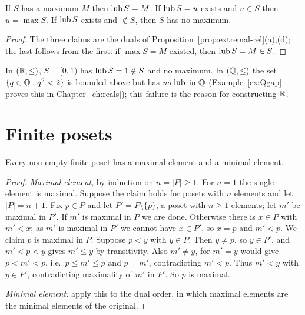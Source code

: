 \begin{proposition}\label{prop:lub-max}
	If $S$ has a maximum $M$ then $\operatorname{lub} S=M$. If $\operatorname{lub} S=u$ exists and $u\in S$ then $u=\max S$. If $\operatorname{lub} S$ exists and $\notin S$, then $S$ has no maximum.
\end{proposition}
\begin{proof}
	The three claims are the duals of Proposition~\ref{prop:extremal-rel}(a),(d); the last follows from the first: if $\max S=M$ existed, then $\operatorname{lub} S=M\in S$.
\end{proof}

\begin{example}
	In $(\mathbb{R},\le)$, $S=[0,1)$ has $\operatorname{lub} S=1\notin S$ and no maximum. In $(\mathbb{Q},\le)$ the set $\{q\in\mathbb{Q}:q^2<2\}$ is bounded above but has \emph{no} $\operatorname{lub}$ in $\mathbb{Q}$ (Example~\ref{ex:Qgap} proves this in Chapter~\ref{ch:reals}); this failure is the reason for constructing $\mathbb{R}$.
\end{example}

\section{Finite posets}

\begin{theorem}\label{thm:finitemax}
	Every non-empty finite poset has a maximal element and a minimal element.
\end{theorem}
\begin{proof}
	\emph{Maximal element}, by induction on $n=|P|\ge1$. For $n=1$ the single element is maximal. Suppose the claim holds for posets with $n$ elements and let $|P|=n+1$. Fix $p\in P$ and let $P'=P\setminus\{p\}$, a poset with $n\ge1$ elements; let $m'$ be maximal in $P'$. If $m'$ is maximal in $P$ we are done. Otherwise there is $x\in P$ with $m'<x$; as $m'$ is maximal in $P'$ we cannot have $x\in P'$, so $x=p$ and $m'<p$. We claim $p$ is maximal in $P$. Suppose $p<y$ with $y\in P$. Then $y\neq p$, so $y\in P'$, and $m'<p<y$ gives $m'\le y$ by transitivity. Also $m'\ne y$, for $m'=y$ would give $p<m'<p$, i.e.\ $p\le m'\le p$ and $p=m'$, contradicting $m'<p$. Thus $m'<y$ with $y\in P'$, contradicting maximality of $m'$ in $P'$. So $p$ is maximal.
	
	\emph{Minimal element:} apply this to the dual order, in which maximal elements are the minimal elements of the original.
\end{proof}

